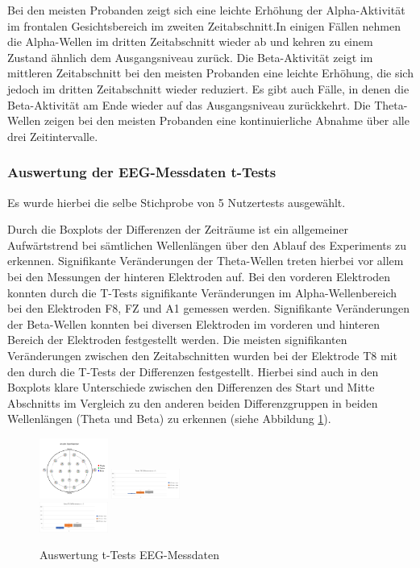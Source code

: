 \documentclass[conference]{IEEEtran}
\begin{document}
Bei den meisten Probanden zeigt sich eine leichte Erhöhung der Alpha-Aktivität im frontalen Gesichtsbereich im zweiten Zeitabschnitt.In einigen Fällen nehmen die Alpha-Wellen im dritten Zeitabschnitt wieder ab und kehren zu einem Zustand ähnlich dem Ausgangsniveau zurück. Die Beta-Aktivität zeigt im mittleren Zeitabschnitt bei den meisten Probanden eine leichte Erhöhung, die sich jedoch im dritten Zeitabschnitt wieder reduziert. Es gibt auch Fälle, in denen die Beta-Aktivität am Ende wieder auf das Ausgangsniveau zurückkehrt. Die Theta-Wellen zeigen bei den meisten Probanden eine kontinuierliche Abnahme über alle drei Zeitintervalle.

\subsubsection{Auswertung der EEG-Messdaten t-Tests}
Es wurde hierbei die selbe Stichprobe von 5 Nutzertests ausgewählt.

Durch die Boxplots der Differenzen der Zeiträume ist ein allgemeiner Aufwärtstrend bei sämtlichen Wellenlängen über den Ablauf des Experiments zu erkennen. Signifikante Veränderungen der Theta-Wellen treten hierbei vor allem bei den Messungen der hinteren Elektroden auf. Bei den vorderen Elektroden konnten durch die T-Tests signifikante Veränderungen im Alpha-Wellenbereich bei den Elektroden F8, FZ und A1 gemessen werden. Signifikante Veränderungen der Beta-Wellen konnten bei diversen Elektroden im vorderen und hinteren Bereich der Elektroden festgestellt werden. Die meisten signifikanten Veränderungen zwischen den Zeitabschnitten wurden bei der Elektrode T8 mit den durch die T-Tests der Differenzen festgestellt. Hierbei sind auch in den Boxplots klare Unterschiede zwischen den Differenzen des Start und Mitte Abschnitts im Vergleich zu den anderen beiden Differenzgruppen in beiden Wellenlängen (Theta und Beta) zu erkennen (siehe Abbildung \ref{fig:auswertung_t_test_eeg}).

\begin{figure}[ht]
	\centering
	\includegraphics[width=0.2\textwidth]{assets/Signifikanzen.png} \hspace{-5pt}
	\includegraphics[width=0.2\textwidth]{assets/ThetaT8.png} \\
	\vspace{2pt}
	\includegraphics[width=0.2\textwidth]{assets/BetaT8.png} \hspace{-5pt}
	\caption{Auswertung t-Tests EEG-Messdaten}
	\label{fig:auswertung_t_test_eeg}
\end{figure}
\end{document}
